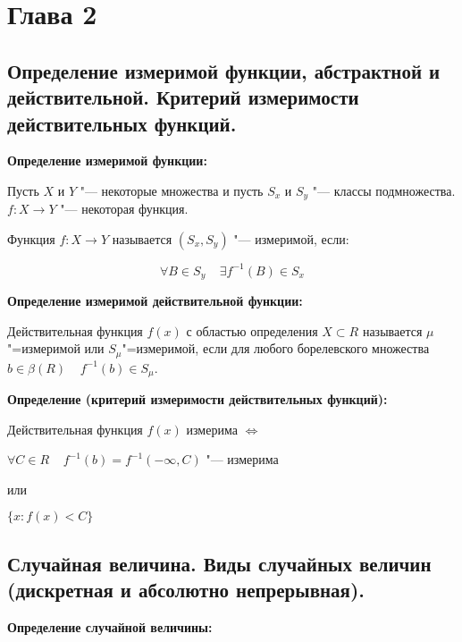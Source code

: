 \section{Глава 2}

\subsection{Определение измеримой функции, абстрактной и действительной.
Критерий измеримости действительных функций.}

\textbf{Определение измеримой функции:}
    \smallskip

    Пусть $X$ и $Y$ "--- некоторые множества
    и пусть $S_x$ и $S_y$ "--- классы подмножества.
    $f: X \rightarrow Y$ "--- некоторая функция.
    \smallskip

    Функция $f: X \rightarrow Y$ называется 
    $(S_x, S_y)$ "--- измеримой, если:

    \[
        \forall B \in S_y \;\;\;\; \exists f^{-1}
        (B) \in S_x
    \]
    \bigskip

\textbf{Определение измеримой действительной
функции:}
    \smallskip
    
    Действительная функция $f(x)$ с областью 
    определения $X \subset R$ называется 
    $\mu$"=измеримой или $S_{\mu}$"=измеримой,
    если для любого борелевского множества $b \in
    \beta(R) \;\;\;\; f^{-1}(b) \in S_{\mu}$.
    \bigskip

\textbf{Определение (критерий измеримости 
действительных функций):}
    \smallskip

    Действительная функция $f(x)$ измерима
    $\Leftrightarrow$

    \begin{center}

        $
            \forall C \in R \;\;\;\; f^{-1}(b) = 
            f^{-1}(-\infty, C)
        $ "--- измерима

        или 

        $\{x : f(x) < C\}$

    \end{center}
    \bigskip

\subsection{Случайная величина. Виды случайных величин (дискретная и 
абсолютно непрерывная).}

\textbf{Определение случайной величины:}
    \smallskip

